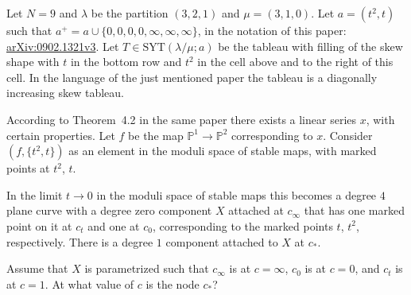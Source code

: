 Let $N=9$ and $\lambda$ be the partition $(3,2,1)$ and $\mu=(3,1,0)$. Let $a=(t^2,t)$ such that $a^+=a\cup \{0,0,0,0,\infty,\infty,\infty\}$, in the notation of this paper: \href{https://arxiv.org/abs/0902.1321v3}{arXiv:0902.1321v3}. Let $T\in \mathrm{SYT}(\lambda/\mu;a)$ be the tableau with filling of the skew shape with $t$ in the bottom row and $t^2$ in the cell above and to the right of this cell. In the language of the just mentioned paper the tableau is a diagonally increasing skew tableau.

According to Theorem~4.2 in the same paper there exists a linear series $x$, with certain properties. Let $f$ be the map $\mathbb{P}^1\rightarrow \mathbb{P}^2$ corresponding to $x$. Consider $(f,\{t^2,t\})$ as an element in the moduli space of stable maps, with marked points at $t^2$, $t$.

In the limit $t\rightarrow 0$ in the moduli space of stable maps this becomes a degree $4$ plane curve with a degree zero component $X$ attached at $c_\infty$ that has one marked point on it at $c_t$ and one at $c_0$, corresponding to the marked points $t$, $t^2$, respectively. There is a degree $1$ component attached to $X$ at $c_*$.

Assume that $X$ is parametrized such that $c_\infty$ is at $c=\infty$, $c_0$ is at $c=0$, and $c_t$ is at $c=1$. At what value of $c$ is the node $c_*$?
